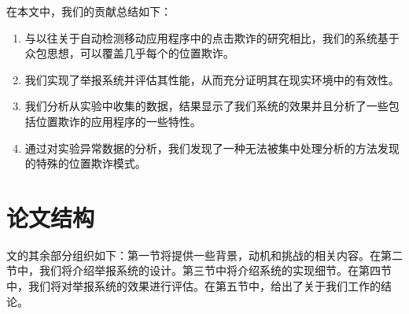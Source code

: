 在本文中，我们的贡献总结如下：
\begin{enumerate}
    \item 与以往关于自动检测移动应用程序中的点击欺诈的研究相比，我们的系统基于众包思想，可以覆盖几乎每个的位置欺诈。
    \item 我们实现了举报系统并评估其性能，从而充分证明其在现实环境中的有效性。
    \item 我们分析从实验中收集的数据，结果显示了我们系统的效果并且分析了一些包括位置欺诈的应用程序的一些特性。
    \item 通过对实验异常数据的分析，我们发现了一种无法被集中处理分析的方法发现的特殊的位置欺诈模式。
\end{enumerate}

\section{论文结构}

文的其余部分组织如下：第一节将提供一些背景，动机和挑战的相关内容。在第二节中，我们将介绍举报系统的设计。第三节中将介绍系统的实现细节。在第四节中，我们将对举报系统的效果进行评估。在第五节中，给出了关于我们工作的结论。


